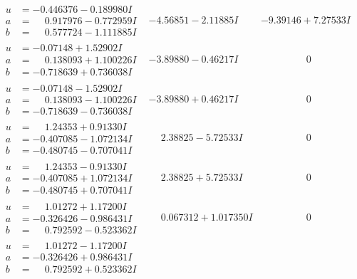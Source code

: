 \documentclass[1p]{elsarticle_modified}
\theoremstyle{definition}
\begin{document}
$$\begin{array}{c|c|c}
\begin{aligned}
u &= -0.446376 - 0.189980 I \\
a &= \phantom{-}0.917976 - 0.772959 I \\
b &= \phantom{-}0.577724 - 1.111885 I\end{aligned}
 & -4.56851 - 2.11885 I & -9.39146 + 7.27533 I \\ \hline\begin{aligned}
u &= -0.07148 + 1.52902 I \\
a &= \phantom{-}0.138093 + 1.100226 I \\
b &= -0.718639 + 0.736038 I\end{aligned}
 & -3.89880 - 0.46217 I & \phantom{-0.000000 } 0 \\ \hline\begin{aligned}
u &= -0.07148 - 1.52902 I \\
a &= \phantom{-}0.138093 - 1.100226 I \\
b &= -0.718639 - 0.736038 I\end{aligned}
 & -3.89880 + 0.46217 I & \phantom{-0.000000 } 0 \\ \hline\begin{aligned}
u &= \phantom{-}1.24353 + 0.91330 I \\
a &= -0.407085 - 1.072134 I \\
b &= -0.480745 - 0.707041 I\end{aligned}
 & \phantom{-}2.38825 - 5.72533 I & \phantom{-0.000000 } 0 \\ \hline\begin{aligned}
u &= \phantom{-}1.24353 - 0.91330 I \\
a &= -0.407085 + 1.072134 I \\
b &= -0.480745 + 0.707041 I\end{aligned}
 & \phantom{-}2.38825 + 5.72533 I & \phantom{-0.000000 } 0 \\ \hline\begin{aligned}
u &= \phantom{-}1.01272 + 1.17200 I \\
a &= -0.326426 - 0.986431 I \\
b &= \phantom{-}0.792592 - 0.523362 I\end{aligned}
 & \phantom{-}0.067312 + 1.017350 I & \phantom{-0.000000 } 0 \\ \hline\begin{aligned}
u &= \phantom{-}1.01272 - 1.17200 I \\
a &= -0.326426 + 0.986431 I \\
b &= \phantom{-}0.792592 + 0.523362 I\end{aligned}

\end{array}$$
\end{document}

